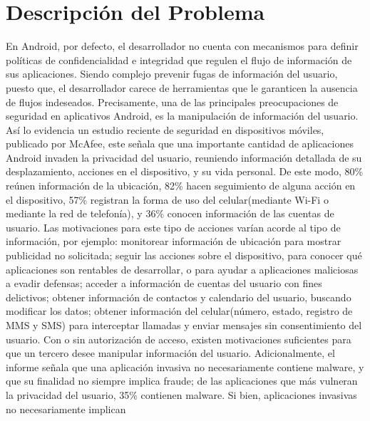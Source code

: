 \label{ch:problema}
\chapter{Descripción del Problema}

En Android, por defecto, el desarrollador no cuenta con mecanismos para
definir políticas de confidencialidad e integridad que regulen
el flujo de información de sus aplicaciones. Siendo complejo prevenir fugas de
información del usuario, puesto que, el desarrollador carece de herramientas que
le garanticen la ausencia de flujos indeseados.\newline
Precisamente, una de las principales preocupaciones de seguridad en aplicativos
Android, es la manipulación de información del usuario.
Así lo evidencia un
estudio reciente de seguridad en dispositivos móviles, publicado por
McAfee\cite{McAfeeReport}, este señala  que una importante cantidad de
aplicaciones Android invaden la privacidad del usuario, reuniendo información
detallada de su desplazamiento, acciones en el dispositivo, y su vida personal.
De este modo, 80\% reúnen información de la ubicación, 82\%
hacen seguimiento de alguna acción en el dispositivo, 57\%
registran la forma de uso del celular(mediante Wi-Fi o
mediante la red de telefonía), y 36\% conocen información de
las cuentas de usuario.\newline
Las motivaciones para este tipo de acciones varían acorde al tipo de
información, por ejemplo: monitorear información de ubicación para mostrar
publicidad no solicitada; seguir las acciones sobre el dispositivo, para conocer
qué aplicaciones son rentables de desarrollar, o para ayudar a aplicaciones
maliciosas a evadir defensas; acceder a información de cuentas del usuario con
fines delictivos; obtener información de contactos y calendario
del usuario, buscando modificar los datos; obtener información del
celular(número, estado, registro de MMS y SMS) para interceptar llamadas y
enviar mensajes sin consentimiento del usuario.\newline 
Con o sin autorización de acceso, existen motivaciones suficientes para que un
tercero desee manipular información del usuario.\newline
Adicionalmente, el informe señala que una aplicación invasiva no necesariamente
contiene malware, y que su finalidad no siempre implica fraude; de las
aplicaciones que más vulneran la privacidad del usuario, 35\% contienen
malware.\newline 
Si bien, aplicaciones invasivas no necesariamente implican
